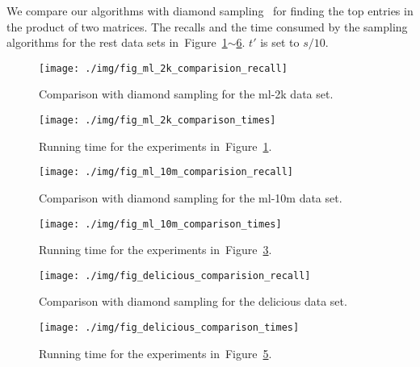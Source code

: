 \documentclass[letterpaper]{article}
\newcommand{\Fig}[1]{Figure~\ref{fig:#1}}
\newcommand{\Figs}[2]{Figure~\ref{fig:#1}$\sim$\ref{fig:#2}}
\begin{document}
We compare our algorithms with diamond sampling~\cite{BaPiKoSe15} 
for finding the top entries in the product of two matrices. 
The recalls and the time consumed by the sampling algorithms for the rest data sets
in~\Figs{ml_2k_comparison_recall}{delicious_comparison_time}.
$t'$ is set to $s/10$. 
\begin{figure}[H]
  \centering
  \texttt{[image: ./img/fig\_ml\_2k\_comparision\_recall]}\\
  \caption{Comparison with diamond sampling for the ml-2k data set.}
  \label{fig:ml_2k_comparison_recall}
\end{figure}
\begin{figure}[H]
    \centering
    \texttt{[image: ./img/fig\_ml\_2k\_comparison\_times]}\\
    \caption{Running time for the experiments in~\Fig{ml_2k_comparison_recall}.}
\label{fig:ml_2k_comparison_time}
\end{figure}
\begin{figure}[H]
  \centering
  \texttt{[image: ./img/fig\_ml\_10m\_comparision\_recall]}\\
  \caption{Comparison with diamond sampling for the ml-10m data set.}
  \label{fig:ml_10m_comparison_recall}
\end{figure}
\begin{figure}[H]
    \centering
    \texttt{[image: ./img/fig\_ml\_10m\_comparison\_times]}\\
    \caption{Running time for the experiments in~\Fig{ml_10m_comparison_recall}.}
\label{fig:ml_10m_comparison_time}
\end{figure}
\begin{figure}[H]
  \centering
  \texttt{[image: ./img/fig\_delicious\_comparision\_recall]}\\
  \caption{Comparison with diamond sampling for the delicious data set.}
  \label{fig:delicious_comparison_recall}
\end{figure}
\begin{figure}[H]
    \centering
    \texttt{[image: ./img/fig\_delicious\_comparison\_times]}\\
    \caption{Running time for the experiments in~\Fig{delicious_comparison_recall}.}
\label{fig:delicious_comparison_time}
\end{figure}
\end{document}
